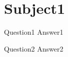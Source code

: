\documentclass{../flashcards}
\begin{document}
\section{Subject1}

\begin{card}{Question1}
Answer1
\end{card}

\begin{card}{Question2}
Answer2
\end{card}




\end{document}
